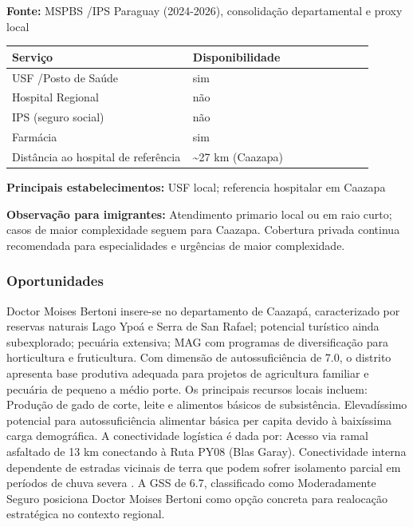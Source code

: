 \textbf{Fonte:} MSPBS /\allowbreak  IPS Paraguay (2024-2026), consolidação
departamental e proxy local

{\def\LTcaptype{none} %
\begin{longtable}{@{}>{\raggedright\arraybackslash}p{0.45\linewidth} >{\raggedright\arraybackslash}p{0.45\linewidth}@{}}
\toprule\noalign{}
Serviço & Disponibilidade \\
\midrule\noalign{}
\endhead
\bottomrule\noalign{}
\endlastfoot
USF /\allowbreak  Posto de Saúde & sim \\
Hospital Regional & não \\
IPS (seguro social) & não \\
Farmácia & sim \\
Distância ao hospital de referência & \textasciitilde27 km (Caazapa) \\
\end{longtable}
}

\textbf{Principais estabelecimentos:} USF local; referencia hospitalar
em Caazapa

\textbf{Observação para imigrantes:} Atendimento primario local ou em
raio curto; casos de maior complexidade seguem para Caazapa. Cobertura
privada continua recomendada para especialidades e urgências de maior
complexidade.
\newpage

\subsubsection*{Oportunidades}\label{oport-doctor-moises-bertoni-0604}
Doctor Moises Bertoni insere-se no departamento de Caazapá, caracterizado por reservas naturais Lago Ypoá e Serra de San Rafael; potencial turístico ainda subexplorado; pecuária extensiva; MAG com programas de diversificação para horticultura e fruticultura. Com dimensão de autossuficiência de 7.0, o distrito apresenta base produtiva adequada para projetos de agricultura familiar e pecuária de pequeno a médio porte. Os principais recursos locais incluem: Produção de gado de corte, leite e alimentos básicos de subsistência. Elevadíssimo potencial para autossuficiência alimentar básica per capita devido à baixíssima carga demográfica. A conectividade logística é dada por: Acesso via ramal asfaltado de 13 km conectando à Ruta PY08 (Blas Garay). Conectividade interna dependente de estradas vicinais de terra que podem sofrer isolamento parcial em períodos de chuva severa . A GSS de 6.7, classificado como Moderadamente Seguro posiciona Doctor Moises Bertoni como opção concreta para realocação estratégica no contexto regional.

